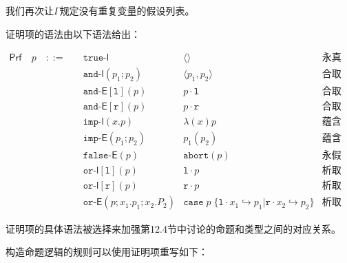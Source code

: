 我们再次让${\Gamma}$规定没有重复变量的假设列表。

证明项的语法由以下语法给出：

$$
\begin{array}{llll}
\mathsf{Prf}\quad p \quad::=\quad
    &\mathtt{true}\text{-}\mathsf{l}            &  \langle \rangle           &\text{永真引入规则}\\
    &\mathtt{and}\text{-}\mathsf{l} (p_1; p_2) & \langle p_1, p_2  \rangle   &\text{合取引入规则}\\
    &\mathtt{and}\text{-}\mathsf{E}[\mathtt{l}] (p)  & p \cdot \mathtt{l}    &\text{合取消去规则}\\
    &\mathtt{and}\text{-}\mathsf{E}[\mathtt{r}] (p)  & p \cdot \mathtt{r}    &\text{合取消去规则}\\
    &\mathtt{imp}\text{-}\mathsf{l}(x. p)            & \lambda (x)  p        &\text{蕴含引入规则}\\
    &\mathtt{imp}\text{-}\mathsf{E}(p_1;p_2)        & p_1 (p_2)              &\text{蕴含消去规则}\\
    &\mathtt{false}\text{-}\mathsf{E}(p)            & \mathtt{abort}(p)       &\text{永假消去规则}\\
    &\mathtt{or}\text{-}\mathsf{l}[\mathtt{l}] (p)  & \mathtt{l} \cdot p   &\text{析取引入规则}\\
    &\mathtt{or}\text{-}\mathsf{l}[\mathtt{r}] (p)  & \mathtt{r} \cdot p   &\text{析取引入规则}\\
    &\mathtt{or}\text{-}\mathsf{E}(p;x_1 . p_1; x_2. P_2)
                &\mathtt{case}\; p \; \{\mathtt{l} \cdot x_1 \hookrightarrow p_1 | \mathtt{r} \cdot x_2\hookrightarrow p_2 \}
                & \text{析取消去规则}
\end{array}
$$

证明项的具体语法被选择来加强第12.4节中讨论的命题和类型之间的对应关系。

构造命题逻辑的规则可以使用证明项重写如下：

